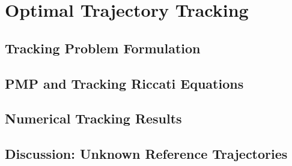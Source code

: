 \section{Optimal Trajectory Tracking}
\label{sec:part2_tracking}


\subsection{Tracking Problem Formulation}
\label{subsec:tracking_formulation}


\subsection{PMP and Tracking Riccati Equations}
\label{subsec:tracking_derivations}


\subsection{Numerical Tracking Results}
\label{subsec:tracking_results}


\subsection{Discussion: Unknown Reference Trajectories}
\label{subsec:unknown_reference_discussion}

